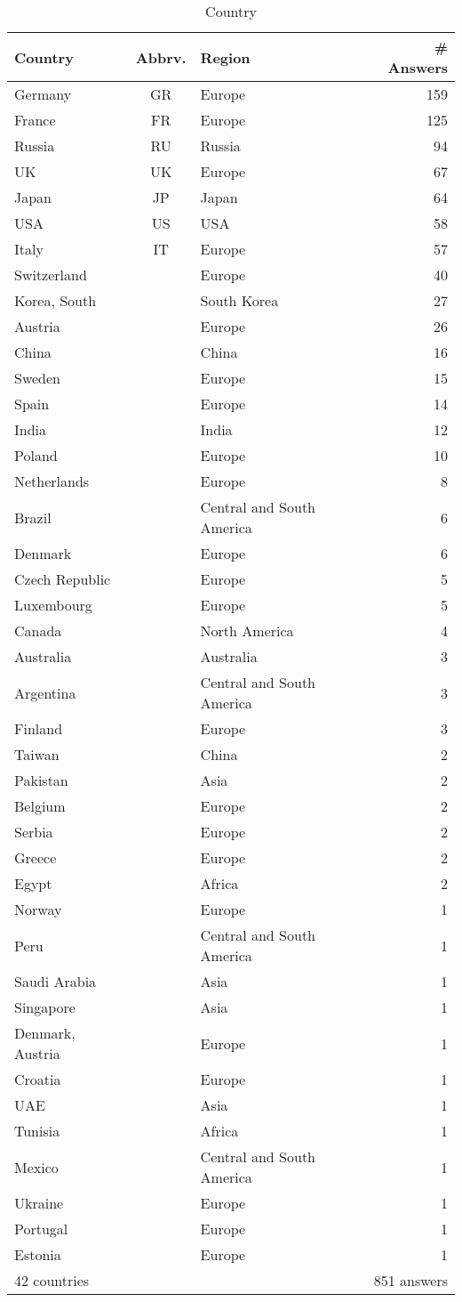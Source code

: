 \begin{table}[htb]%
\begin{center}%
\caption{Country}\label{tab:countries}%
\begin{tabular}{l|c|l|r}%
\hline%
Country & Abbrv. & Region & \# Answers \\%
\hline%
Germany&GR&Europe&159\\%
France&FR&Europe&125\\%
Russia&RU&Russia&94\\%
UK&UK&Europe&67\\%
Japan&JP&Japan&64\\%
USA&US&USA&58\\%
Italy&IT&Europe&57\\%
\hline%
Switzerland&&Europe&40\\%
Korea, South&&South Korea&27\\%
Austria&&Europe&26\\%
China&&China&16\\%
Sweden&&Europe&15\\%
Spain&&Europe&14\\%
India&&India&12\\%
Poland&&Europe&10\\%
Netherlands&&Europe&8\\%
Brazil&&Central and South America&6\\%
Denmark&&Europe&6\\%
Czech Republic&&Europe&5\\%
Luxembourg&&Europe&5\\%
Canada&&North America&4\\%
Australia&&Australia&3\\%
Argentina&&Central and South America&3\\%
Finland&&Europe&3\\%
Taiwan&&China&2\\%
Pakistan&&Asia&2\\%
Belgium&&Europe&2\\%
Serbia&&Europe&2\\%
Greece&&Europe&2\\%
Egypt&&Africa&2\\%
Norway&&Europe&1\\%
Peru&&Central and South America&1\\%
Saudi Arabia&&Asia&1\\%
Singapore&&Asia&1\\%
Denmark, Austria&&Europe&1\\%
Croatia&&Europe&1\\%
UAE&&Asia&1\\%
Tunisia&&Africa&1\\%
Mexico&&Central and South America&1\\%
Ukraine&&Europe&1\\%
Portugal&&Europe&1\\%
Estonia&&Europe&1\\%
\hline%
42 countries & & & 851 answers \\%
\hline%
\end{tabular}%
\end{center}%
\end{table}%
